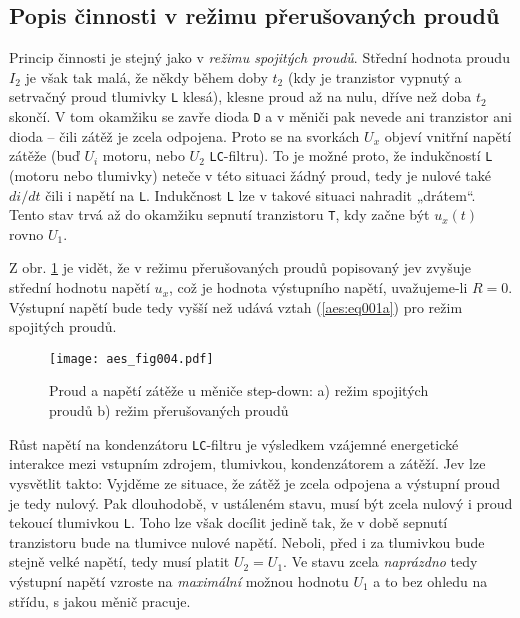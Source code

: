 {    \subsection{Popis činnosti v režimu přerušovaných proudů}
      Princip činnosti je stejný jako v \emph{režimu spojitých proudů}. Střední hodnota proudu 
      \(I_2\) je však tak malá, že někdy během doby \(t_2\) (kdy je tranzistor vypnutý a setrvačný 
      proud tlumivky \texttt{L} klesá), klesne proud až na nulu, dříve než doba \(t_2\) skončí. V 
      tom okamžiku se zavře dioda \texttt{D} a v měniči pak nevede ani tranzistor ani dioda – čili 
      zátěž je zcela odpojena. Proto se na svorkách \(U_x\) objeví vnitřní napětí zátěže
      (buď \(U_i\) motoru, nebo \(U_2\) \texttt{LC}-filtru). To je možné proto, že indukčností 
      \texttt{L} (motoru nebo tlumivky) neteče v této situaci žádný proud, tedy je nulové také 
      \(di/dt\) čili i napětí na \texttt{L}. Indukčnost \texttt{L} lze v takové situaci nahradit 
      „drátem“. Tento stav trvá až do okamžiku sepnutí tranzistoru \texttt{T}, kdy začne být 
      \(u_x(t)\) rovno \(U_1\).
      
      Z obr. \ref{aes:fig004} je vidět, že v režimu přerušovaných proudů popisovaný jev zvyšuje 
      střední hodnotu napětí \(u_x\), což je hodnota výstupního napětí, uvažujeme-li \(R = 0\). 
      Výstupní napětí bude tedy vyšší než  udává vztah (\ref{aes:eq001a}) pro režim spojitých 
      proudů.
      
      \begin{figure}[ht!]
        \centering
        \texttt{[image: aes\_fig004.pdf]}
        \caption{Proud a napětí zátěže u měniče step-down: a) režim spojitých proudů
                 b) režim přerušovaných proudů}
        \label{aes:fig004}
      \end{figure} 
      Růst napětí na kondenzátoru \texttt{LC}-filtru je výsledkem vzájemné energetické interakce 
      mezi vstupním zdrojem, tlumivkou, kondenzátorem a zátěží. Jev lze vysvětlit takto:
      Vyjděme ze situace, že zátěž je zcela odpojena a výstupní proud je tedy nulový. Pak 
      dlouhodobě, v ustáleném stavu, musí být zcela nulový i proud tekoucí tlumivkou \texttt{L}. 
      Toho lze však docílit jedině tak, že v době sepnutí tranzistoru bude na tlumivce nulové 
      napětí. Neboli, před i za tlumivkou bude stejně velké napětí, tedy musí platit \(U_2 = U_1\). 
      Ve stavu zcela \emph{naprázdno} tedy výstupní napětí vzroste na \emph{maximální} možnou 
      hodnotu \(U_1\) a to bez ohledu na střídu, s jakou měnič pracuje.
      
}
